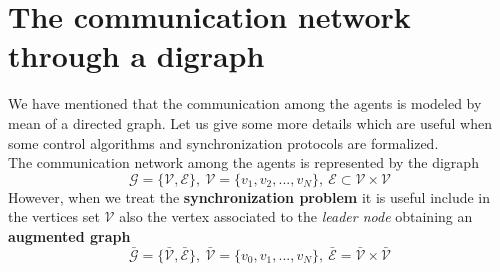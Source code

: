 \section{The communication network through a digraph}
\noindent
We have mentioned that the communication among the agents is modeled by mean of a directed graph. Let us give some more details which are useful when some control algorithms and synchronization protocols are formalized.\\
\noindent
The communication network among the agents is represented by the digraph
{\large{
    \begin{equation}
        \mathcal{G} = \{\mathcal{V}, \mathcal{E}\}, \ \mathcal{V}=\{v_1, v_2, ..., v_N\}, \ 
        \mathcal{E} \subset \mathcal{V} \times \mathcal{V}
    \end{equation}
}}
However, when we treat the \textbf{synchronization problem} it is useful include in the vertices set $\mathcal{V}$ also the vertex associated to the \textit{leader node} obtaining an \textbf{augmented graph}
{\large{
    \begin{equation}
        \bar{\mathcal{G}} = \{
            \bar{\mathcal{V}}, \bar{\mathcal{E}}
        \}, \ 
        \bar{\mathcal{V}}=\{v_0, v_1, ...,v_N\}, \ 
        \bar{\mathcal{E}}=\bar{\mathcal{V}} \times \bar{\mathcal{V}}
    \end{equation}
}}
